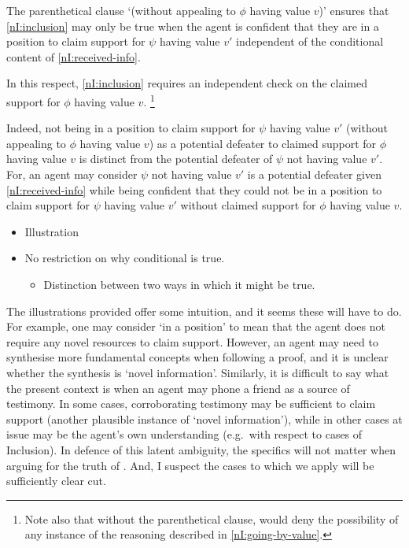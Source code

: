 \begin{note}
  The parenthetical clause `(without appealing to \(\phi\) having value \(v\))' ensures that \ref{nI:inclusion} may only be true when the agent is confident that they are in a position to claim support for \(\psi\) having value \(v'\) independent of the conditional content of \ref{nI:received-info}.

  In this respect, \ref{nI:inclusion} requires an independent check on the claimed support for \(\phi\) having value \(v\).\nolinebreak
  \footnote{
    Note also that without the parenthetical clause, \nI{} would deny the possibility of any instance of the reasoning described in \ref{nI:going-by-value}.
  }

  Indeed, not being in a position to claim support for \(\psi\) having value \(v'\) (without appealing to \(\phi\) having value \(v\)) as a potential defeater to claimed support for \(\phi\) having value \(v\) is distinct from the potential defeater of \(\psi\) not having value \(v'\).
  For, an agent may consider \(\psi\) not having value \(v'\) is a potential defeater given \ref{nI:received-info} while being confident that they could not be in a position to claim support for \(\psi\) having value \(v'\) without claimed support for \(\phi\) having value \(v\).

  \begin{itemize}
  \item Illustration
  \item No restriction on why conditional is true.
    \begin{itemize}
    \item Distinction between two ways in which it might be true.
    \end{itemize}
  \end{itemize}
\end{note}



\begin{note}
  \color{red}
  The illustrations provided offer some intuition, and it seems these will have to do.
  For example, one may consider `in a position' to mean that the agent does not require any novel resources to claim support.
  However, an agent may need to synthesise more fundamental concepts when following a proof, and it is unclear whether the synthesis is `novel information'.
  Similarly, it is difficult to say what the present context is when an agent may phone a friend as a source of testimony.
  In some cases, corroborating testimony may be sufficient to claim support (another plausible instance of `novel information'), while in other cases at issue may be the agent's own understanding (e.g.\ with respect to cases of Inclusion).
  In defence of this latent ambiguity, the specifics will not matter when arguing for the truth of \nI{}.
  And, I suspect the cases to which we apply \nI{} will be sufficiently clear cut.
\end{note}

